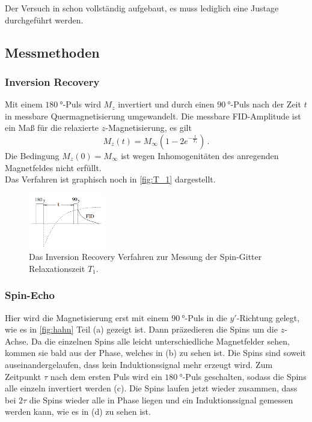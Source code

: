         \noindent Der Versuch in schon vollständig aufgebaut, es muss lediglich eine Justage durchgeführt werden. 

    \subsection{Messmethoden}
    \label{sec:Messmethoden}

    \subsubsection{Inversion Recovery}

        Mit einem $\SI{180}{\degree}$-Puls wird $M_z$ invertiert und durch einen $\SI{90}{\degree}$-Puls nach der Zeit $t$ 
        in messbare Quermagnetisierung umgewandelt. Die messbare FID-Amplitude ist ein Maß für die relaxierte $z$-Magnetisierung, es gilt 
        \begin{equation*}
            M_z(t) = M_\infty \left(1 - 2e^{-\frac{t}{T_1}}\right)\, .
        \end{equation*}
        Die Bedingung $M_z(0) = M_\infty$ ist wegen Inhomogenitäten des anregenden Magnetfeldes nicht erfüllt. \\
        Das Verfahren ist graphisch noch in \autoref{fig:T_1} dargestellt. 

        \begin{figure}%
            \centering%
            \includegraphics[width=0.3\textwidth]{latex/images/t_1_messung.png}%
            \caption{Das Inversion Recovery Verfahren zur Messung der Spin-Gitter Relaxationszeit $T_1$. \cite{grundlagen}}%
            \label{fig:T_1}%
        \end{figure}%

    \subsubsection{Spin-Echo}

        \noindent Hier wird die Magnetisierung erst mit einem $\SI{90}{\degree}$-Puls in die $y'$-Richtung gelegt, wie es in \autoref{fig:hahn} Teil (a) gezeigt ist. Dann präzedieren die Spins 
        um die $z$-Achse. Da die einzelnen Spins alle leicht unterschiedliche Magnetfelder sehen, kommen sie bald aus der Phase, welches in (b) zu sehen ist. Die Spins sind soweit auseinandergelaufen, 
        dass kein Induktionssignal mehr erzeugt wird. Zum Zeitpunkt $\tau$ nach dem ersten Puls wird ein $\SI{180}{\degree}$-Puls geschalten, sodass die Spins alle einzeln invertiert werden (c). 
        Die Spins laufen jetzt wieder zusammen, dass bei $2 \tau$ die Spins wieder alle in Phase liegen und ein Induktionssignal gemessen werden kann, wie es in (d) zu sehen ist.  

